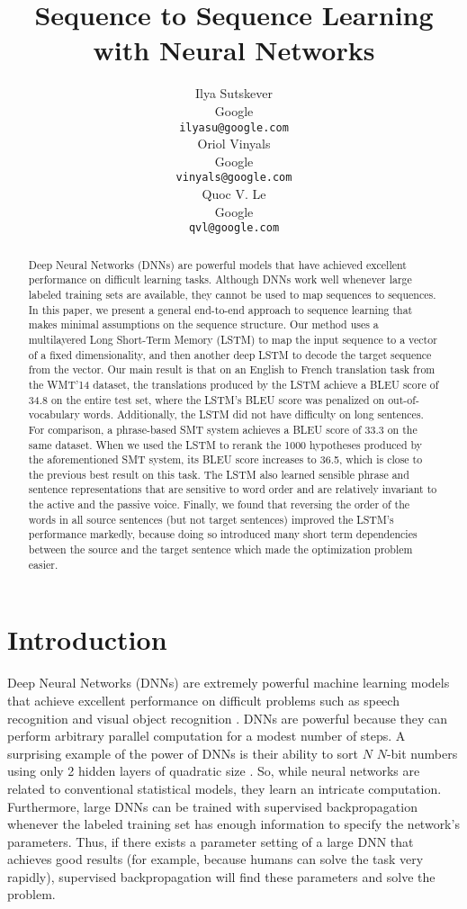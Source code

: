 \documentclass{article} \usepackage{nips14submit_e}
\title{Sequence to Sequence Learning\\with Neural Networks}
\author{
Ilya Sutskever \\
Google\\
\texttt{ilyasu@google.com} \\
\And
Oriol Vinyals \\
Google\\
\texttt{vinyals@google.com} \\
\And
Quoc V. Le \\
Google\\
\texttt{qvl@google.com} \\
}
\begin{document}
\maketitle

\begin{abstract}

Deep Neural Networks (DNNs) are powerful models that have achieved
excellent performance on difficult learning tasks. Although DNNs work
well whenever large labeled training sets are available, 
they cannot be used to map sequences to sequences.  In this paper, we
present a general end-to-end approach to sequence learning that makes
minimal assumptions on the sequence structure. Our method uses a
multilayered Long Short-Term Memory (LSTM) to map the input sequence
to a vector of a fixed dimensionality, and then another deep LSTM to
decode the target sequence from the vector.  Our main result is that
on an English to French translation task from the WMT'14 dataset, the
translations produced by the LSTM achieve a BLEU score of 34.8 on the
entire test set, where the LSTM's BLEU score was penalized on
out-of-vocabulary words. Additionally, the LSTM did not have
difficulty on long sentences. For comparison, a phrase-based
SMT system achieves a BLEU score of 33.3 on the same dataset.  When we
used the LSTM to rerank the 1000 hypotheses produced by the
aforementioned SMT system, its BLEU score increases to 36.5, which
is close to the previous best result on this task.  The LSTM also learned sensible
phrase and sentence representations that are sensitive to word order
and are relatively invariant to the active and the passive voice.
Finally, we found that reversing the order of the words in all source
sentences (but not target sentences) improved the LSTM's performance
markedly, because doing so introduced many short term dependencies
between the source and the target sentence which made the optimization
problem easier.

\end{abstract}
 
\section{Introduction}

Deep Neural Networks (DNNs) are extremely powerful machine learning
models that achieve excellent performance on difficult problems such
as speech recognition \cite{hinton12,dahl12b} and visual object
recognition \cite{kriz12,ciresan12,lecun98,le12}.  DNNs are
powerful because they can perform arbitrary parallel computation for a
modest number of steps.  A surprising example of the power of DNNs is
their ability to sort $N$ \!\!\!\!\quad $N$-bit numbers using only 2
hidden layers of quadratic size \cite{razborov}. So, while neural
networks are related to conventional statistical models, they learn an
intricate computation.  Furthermore, large DNNs can be trained with
supervised backpropagation whenever the labeled training set has
enough information to specify the network's parameters.  Thus, if
there exists a parameter setting of a large DNN that achieves good
results (for example, because humans can solve the task very rapidly),
supervised backpropagation will find these parameters and solve the
problem.
\end{document}
